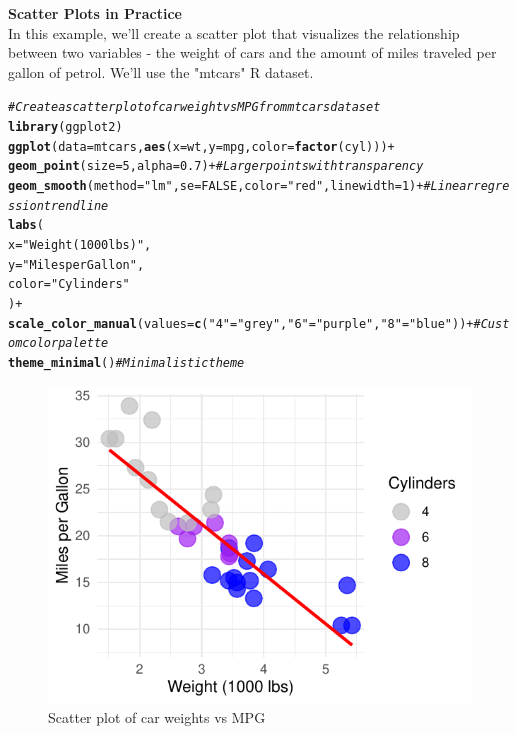 \documentclass{article}\usepackage[]{graphicx}\usepackage[]{xcolor}
\makeatletter
\def\maxwidth{ %
  \ifdim\Gin@nat@width>\linewidth
    \linewidth
  \else
    \Gin@nat@width
  \fi
}
\newcommand{\hlnum}[1]{\textcolor[rgb]{0.686,0.059,0.569}{#1}}%
\newcommand{\hlstr}[1]{\textcolor[rgb]{0.192,0.494,0.8}{#1}}%
\newcommand{\hlcom}[1]{\textcolor[rgb]{0.678,0.584,0.686}{\textit{#1}}}%
\newcommand{\hlopt}[1]{\textcolor[rgb]{0,0,0}{#1}}%
\newcommand{\hlstd}[1]{\textcolor[rgb]{0.345,0.345,0.345}{#1}}%
\newcommand{\hlkwc}[1]{\textcolor[rgb]{0.333,0.667,0.333}{#1}}%
\newcommand{\hlkwd}[1]{\textcolor[rgb]{0.737,0.353,0.396}{\textbf{#1}}}%
\newenvironment{kframe}{%
 \def\at@end@of@kframe{}%
 \ifinner\ifhmode%
  \def\at@end@of@kframe{\end{minipage}}%
  \begin{minipage}{\columnwidth}%
 \fi\fi%
 \def\FrameCommand##1{\hskip\@totalleftmargin \hskip-\fboxsep
 \colorbox{shadecolor}{##1}\hskip-\fboxsep
     \hskip-\linewidth \hskip-\@totalleftmargin \hskip\columnwidth}%
 \MakeFramed {\advance\hsize-\width
   \@totalleftmargin\z@ \linewidth\hsize
   \@setminipage}}%
 {\par\unskip\endMakeFramed%
 \at@end@of@kframe}
\newenvironment{knitrout}{}{} %
\makeatother
\begin{document}
\textbf{Scatter Plots in Practice}\\
In this example, we'll create a scatter plot that visualizes the relationship between two variables - the weight of cars and the amount of miles traveled per gallon of petrol. We'll use the "mtcars" R dataset.

\begin{knitrout}
\color{fgcolor}\begin{kframe}
\begin{alltt}
\hlcom{# Create a scatter plot of car weight vs MPG from mtcars dataset}
\hlkwd{library}\hlstd{(ggplot2)}
\hlkwd{ggplot}\hlstd{(}\hlkwc{data} \hlstd{= mtcars,} \hlkwd{aes}\hlstd{(}\hlkwc{x} \hlstd{= wt,} \hlkwc{y} \hlstd{= mpg,} \hlkwc{color} \hlstd{=} \hlkwd{factor}\hlstd{(cyl)))} \hlopt{+}
  \hlkwd{geom_point}\hlstd{(}\hlkwc{size} \hlstd{=} \hlnum{5}\hlstd{,} \hlkwc{alpha} \hlstd{=} \hlnum{0.7}\hlstd{)} \hlopt{+}  \hlcom{# Larger points with transparency}
  \hlkwd{geom_smooth}\hlstd{(}\hlkwc{method} \hlstd{=} \hlstr{"lm"}\hlstd{,} \hlkwc{se} \hlstd{=} \hlnum{FALSE}\hlstd{,} \hlkwc{color} \hlstd{=} \hlstr{"red"}\hlstd{,} \hlkwc{linewidth} \hlstd{=} \hlnum{1}\hlstd{)} \hlopt{+}  \hlcom{# Linear regression trend line}
  \hlkwd{labs}\hlstd{(}
    \hlkwc{x} \hlstd{=} \hlstr{"Weight (1000 lbs)"}\hlstd{,}
    \hlkwc{y} \hlstd{=} \hlstr{"Miles per Gallon"}\hlstd{,}
    \hlkwc{color} \hlstd{=} \hlstr{"Cylinders"}
  \hlstd{)} \hlopt{+}
  \hlkwd{scale_color_manual}\hlstd{(}\hlkwc{values} \hlstd{=} \hlkwd{c}\hlstd{(}\hlstr{"4"} \hlstd{=} \hlstr{"grey"}\hlstd{,} \hlstr{"6"} \hlstd{=} \hlstr{"purple"}\hlstd{,} \hlstr{"8"} \hlstd{=} \hlstr{"blue"}\hlstd{))} \hlopt{+}  \hlcom{# Custom color palette}
  \hlkwd{theme_minimal}\hlstd{()}  \hlcom{# Minimalistic theme}
\end{alltt}


{\ttfamily\noindent\itshape{}}\end{kframe}\begin{figure}
\includegraphics[width=\maxwidth]{figure/scatter-plot-1} \caption[Scatter plot of car weights vs MPG]{Scatter plot of car weights vs MPG}\label{fig:scatter-plot}
\end{figure}


\end{knitrout}
\end{document}
